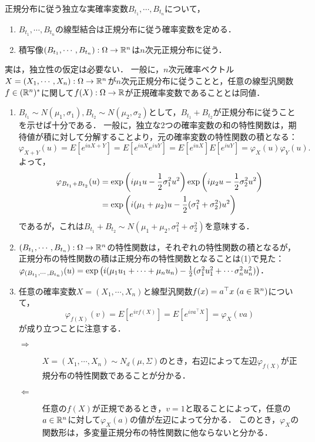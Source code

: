 \documentclass[uplatex,dvipdfmx]{jsreport}
\begin{document}
\begin{lemma}[高次元正規分布の特徴付け]
    正規分布に従う独立な実確率変数$B_{t_1},\cdots,B_{t_n}$について，
    \begin{enumerate}
        \item $B_{t_1},\cdots,B_{t_n}$の線型結合は正規分布に従う確率変数を定める．
        \item 積写像$(B_{t_1},\cdots,B_{t_n}):\Omega\to\mathbb{R}^n$は$n$次元正規分布に従う．
    \end{enumerate}
    実は，独立性の仮定は必要ない．
    一般に，$n$次元確率ベクトル$X=(X_1,\cdots,X_n):\Omega\to\mathbb{R}^n$が$n$次元正規分布に従うことと，任意の線型汎関数$f\in(\mathbb{R}^n)^*$に関して$f(X):\Omega\to\mathbb{R}$が正規確率変数であることとは同値．
\end{lemma}
\begin{Proof}\mbox{}
    \begin{enumerate}
        \item $B_{t_1}\sim N(\mu_1,\sigma_1),B_{t_2}\sim N(\mu_2,\sigma_2)$として，$B_{t_1}+B_{t_2}$が正規分布に従うことを示せば十分である．
        一般に，独立な2つの確率変数の和の特性関数は，期待値が積に対して分解することより，元の確率変数の特性関数の積となる：\[\varphi_{X+Y}(u)=E[e^{iuX+Y}]=E[e^{iuX}e^{iuY}]=E[e^{iuX}]E[e^{iuY}]=\varphi_X(u)\varphi_Y(u).\]
        よって，
        \begin{align*}
            \varphi_{B_{t_1}+B_{t_2}}(u)&=\exp\left(i\mu_1u-\frac{1}{2}\sigma_1^2u^2\right)\exp\left(i\mu_2u-\frac{1}{2}\sigma^2_2u^2\right)\\
            &=\exp\left(i(\mu_1+\mu_2)u-\frac{1}{2}(\sigma^2_1+\sigma^2_2)u^2\right)
        \end{align*}
        であるが，これは$B_{t_1}+B_{t_2}\sim N(\mu_1+\mu_2,\sigma^2_1+\sigma^2_2)$を意味する．
        \item $(B_{t_1},\cdots,B_{t_n}):\Omega\to\mathbb{R}^n$の特性関数は，それぞれの特性関数の積となるが，正規分布の特性関数の積は正規分布の特性関数となることは(1)で見た：$\varphi_{(B_{t_1},\cdots,B_{t_n})}(u)=\exp\left(i(\mu_1u_1+\cdots+\mu_nu_n)-\frac{1}{2}(\sigma_1^2u_1^2+\cdots\sigma_n^2u_n^2)\right)$．
        \item 任意の確率変数$X=(X_1,\cdots,X_n)$と線型汎関数$f(x)=a^\top x\;(a\in\mathbb{R}^n)$について，
        \[\varphi_{f(X)}(v)=E[e^{ivf(X)}]=E[e^{iva^\top X}]=\varphi_X(va)\]
        が成り立つことに注意する．
        \begin{description}
            \item[$\Rightarrow$] $X=(X_1,\cdots,X_n)\sim N_d(\mu,\Sigma)$のとき，右辺によって左辺$\varphi_{f(X)}$が正規分布の特性関数であることが分かる．
            \item[$\Leftarrow$] 任意の$f(X)$が正規であるとき，$v=1$と取ることによって，任意の$a\in\mathbb{R}^n$に対して$\varphi_X(a)$の値が左辺によって分かる．
            このとき，$\varphi_X$の関数形は，多変量正規分布の特性関数に他ならないと分かる．
        \end{description}
    \end{enumerate}
\end{Proof}
\end{document}

